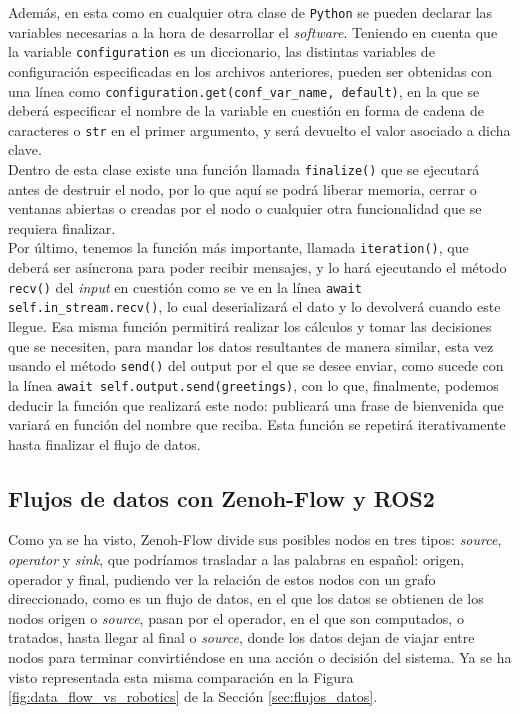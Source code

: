 Además, en esta como en cualquier otra clase de \texttt{Python} se pueden
declarar las variables necesarias a la hora de desarrollar el \textit{software}.
Teniendo en cuenta que la variable \verb|configuration| es un diccionario, las
distintas variables de configuración especificadas en los archivos anteriores,
pueden ser obtenidas con una línea como
\verb|configuration.get(conf_var_name, default)|, en la que se deberá
especificar el nombre de la variable en cuestión en forma de cadena de
caracteres o \texttt{str} en el primer argumento, y será devuelto el valor
asociado a dicha clave.
\\

Dentro de esta clase existe una función llamada \verb|finalize()| que se
ejecutará antes de destruir el nodo, por lo que aquí se podrá liberar memoria,
cerrar o ventanas abiertas o creadas por el nodo o cualquier otra funcionalidad
que se requiera finalizar.
\\

Por último, tenemos la función más importante, llamada \verb|iteration()|, que
deberá ser asíncrona para poder recibir mensajes, y lo hará ejecutando el método
\verb|recv()| del \textit{input} en cuestión como se ve en la línea
\verb|await self.in_stream.recv()|, lo cual deserializará el dato y lo devolverá
cuando este llegue.
Esa misma función permitirá realizar los cálculos y tomar las decisiones que se
necesiten, para mandar los datos resultantes de manera similar, esta vez usando
el método \verb|send()| del output por el que se desee enviar, como sucede con
la línea \verb|await self.output.send(greetings)|, con lo que, finalmente,
podemos deducir la función que realizará este nodo: publicará una frase de
bienvenida que variará en función del nombre que reciba.
Esta función se repetirá iterativamente hasta finalizar el flujo de datos.
\\



\subsection{Flujos de datos con Zenoh-Flow y ROS2}
\label{sec:zf_ros}
Como ya se ha visto, Zenoh-Flow divide sus posibles nodos en tres tipos:
\textit{source}, \textit{operator} y \textit{sink}, que podríamos trasladar a
las palabras en español: origen, operador y final, pudiendo ver la relación de
estos nodos con un grafo direccionado, como es un flujo de datos, en el que
los datos se obtienen de los nodos origen o \textit{source}, pasan por el
operador, en el que son computados, o tratados, hasta llegar al final o
\textit{source}, donde los datos dejan de viajar entre nodos para terminar
convirtiéndose en una acción o decisión del sistema.
Ya se ha visto representada esta misma comparación en la Figura
\ref{fig:data_flow_vs_robotics} de la Sección \ref{sec:flujos_datos}.

